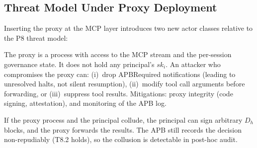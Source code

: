 \documentclass[11pt]{article}
\newcommand{\Dh}{D_h}
\newcommand{\ski}{sk_i}
\begin{document}
\subsection{Threat Model Under Proxy Deployment}
\label{sec:threats}

Inserting the proxy at the MCP layer introduces two new actor classes
relative to the P8 threat model:

\begin{description}[leftmargin=2em, topsep=2pt]
  \item[M1. Compromised proxy process.]
        The proxy is a process with access to the MCP stream and the
        per-session governance state. It does not hold any principal's
        $\ski$. An attacker who compromises the proxy can: (i)~drop
        APBRequired notifications (leading to unresolved halts, not
        silent resumption), (ii)~modify tool call arguments before
        forwarding, or (iii)~suppress tool results. Mitigations:
        proxy integrity (code signing, attestation), and monitoring of
        the APB log.
  \item[M2. Colluding proxy + principal.]
        If the proxy process and the principal collude, the principal
        can sign arbitrary $\Dh$ blocks, and the proxy forwards the
        results. The APB still records the decision non-repudiably
        (T8.2 holds), so the collusion is detectable in post-hoc audit.
\end{description}
\end{document}
